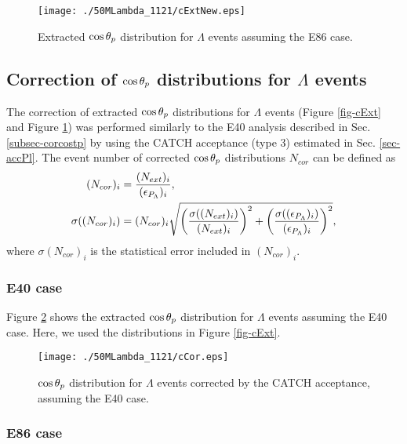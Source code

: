 \begin{figure}[h]
  \centering
  \texttt{[image: ./50MLambda\_1121/cExtNew.eps]}
  \caption{Extracted $\cos{\theta_p}$ distribution for $\Lambda$ events assuming the E86 case.}
  \label{fig-cExtNew}
\end{figure}


\subsection{Correction of $\cos{\theta_p}$ distributions for $\Lambda$ events}
\label{subsec-randext}

The correction of extracted $\cos{\theta_p}$ distributions for $\Lambda$ events (Figure \ref{fig-cExt} and Figure \ref{fig-cExtNew}) was performed similarly to the E40 analysis described in Sec. \ref{subsec-corcostp} by using the CATCH acceptance (type 3) estimated in Sec. \ref{sec-accPl}. The event number of corrected $\cos{\theta_p}$ distributions $N_{cor}$ can be defined as 
\begin{align}
  (N_{cor})_i &= \frac{(N_{ext})_i}{(\epsilon_{P_{\Lambda}})_i}, \\
  \sigma((N_{cor})_i) &= (N_{cor})_i \sqrt{\left( \frac{\sigma((N_{ext})_i)}{(N_{ext})_i} \right)^2 +\left( \frac{\sigma((\epsilon_{P_{\Lambda}})_i)}{(\epsilon_{P_{\Lambda}})_i} \right)^2},
\end{align}
where $\sigma(N_{cor})_i$ is the statistical error included in $(N_{cor})_i$.


\subsubsection{E40 case}
\label{subsubsec-randcore40}

Figure \ref{fig-cCor} shows the extracted $\cos{\theta_p}$ distribution for $\Lambda$ events assuming the E40 case. Here, we used the distributions in Figure \ref{fig-cExt}. 

\begin{figure}[h]
  \centering
  \texttt{[image: ./50MLambda\_1121/cCor.eps]}
  \caption{$\cos{\theta_p}$ distribution for $\Lambda$ events corrected by the CATCH acceptance, assuming the E40 case.}
  \label{fig-cCor}
\end{figure}

\subsubsection{E86 case}
\label{subsubsec-randcore86}

